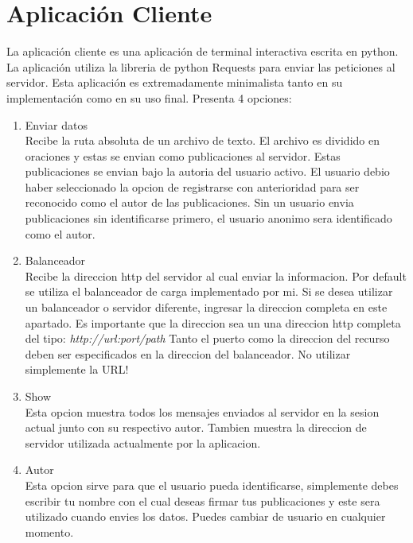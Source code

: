 \documentclass{article}
\author{\nombre , \carnet}
\title{\titulo}
\begin{document}
\maketitle

\section{Aplicación Cliente}
La aplicación cliente es una aplicación de terminal interactiva escrita
en python. La aplicación utiliza la libreria de python Requests para enviar las peticiones al servidor.
Esta aplicación es extremadamente minimalista tanto en su implementación como en su uso final.
Presenta 4 opciones:
\begin{enumerate}
  \item Enviar datos \\
    Recibe la ruta absoluta de un archivo de texto. El archivo
    es dividido en oraciones y estas se envian como publicaciones
    al servidor. Estas publicaciones se envian bajo la autoria del
    usuario activo. El usuario debio haber seleccionado la opcion
    de registrarse con anterioridad para ser reconocido como el 
    autor de las publicaciones. Sin un usuario envia publicaciones
    sin identificarse primero, el usuario anonimo sera identificado
    como el autor.
  \item Balanceador \\
    Recibe la direccion http del servidor al cual enviar la informacion.
    Por default se utiliza el balanceador de carga implementado por mi.
    Si se desea utilizar un balanceador o servidor diferente, ingresar
    la direccion completa en este apartado. Es importante 
    que la direccion sea un una direccion http completa del tipo:
    \textit{http://url:port/path}  Tanto el puerto como la direccion
    del recurso deben ser especificados en la direccion del balanceador.
    No utilizar simplemente la URL!
  \item Show \\
    Esta opcion muestra todos los mensajes enviados al servidor 
    en la sesion actual junto con su respectivo autor.
    Tambien muestra la direccion de servidor utilizada actualmente 
    por la aplicacion.
  \item Autor \\
    Esta opcion sirve para que el usuario pueda identificarse, 
    simplemente debes escribir tu nombre con el cual deseas 
    firmar tus publicaciones y este sera utilizado cuando 
    envies los datos. Puedes cambiar de usuario en cualquier momento.
\end{enumerate}
\end{document}

